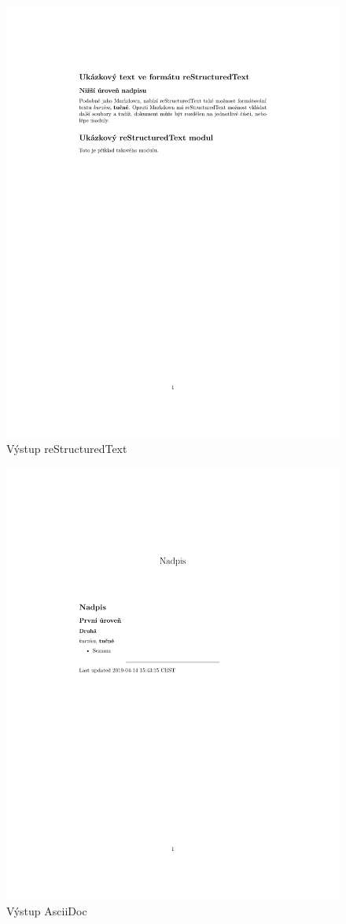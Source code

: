 \begin{figure}[h]
    \centering
    \includegraphics[width=\textwidth]{example-rst.pdf}
    \caption{Výstup reStructuredText}
    \label{fig:rstOutput}
\end{figure}

\begin{figure}[h]
    \centering
    \includegraphics[width=\textwidth]{example-ascii.pdf}
    \caption{Výstup AsciiDoc}
    \label{fig:asciiOutput}
\end{figure}
